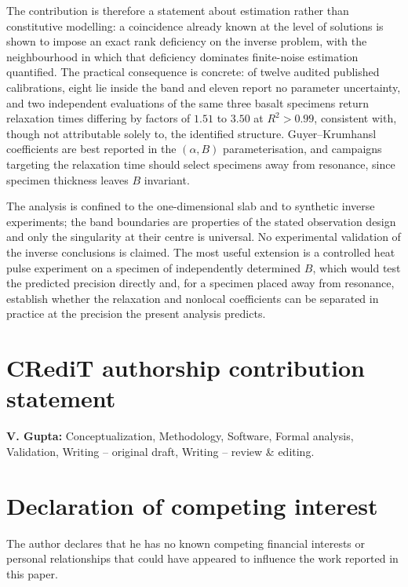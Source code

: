 \documentclass[preprint,12pt,a4paper]{elsarticle}
\theoremstyle{plain}
\theoremstyle{definition}
\theoremstyle{remark}
\newcommand{\Bnum}{B}
\begin{document}
The contribution is therefore a statement about estimation rather than
constitutive modelling: a coincidence already known at the level of
solutions is shown to impose an exact rank deficiency on the inverse
problem, with the neighbourhood in which that deficiency dominates
finite-noise estimation quantified. The practical consequence is concrete:
of twelve audited published calibrations, eight lie inside the band and
eleven report no parameter uncertainty, and two independent evaluations of
the same three basalt specimens return relaxation times differing by
factors of $1.51$ to $3.50$ at $R^{2}>0.99$, consistent with, though not
attributable solely to, the identified structure. Guyer--Krumhansl
coefficients are best reported in the $(\alpha,\Bnum)$ parameterisation, and
campaigns targeting the relaxation time should select specimens away from
resonance, since specimen thickness leaves $\Bnum$ invariant.

The analysis is confined to the one-dimensional slab and to synthetic inverse
experiments; the band boundaries are properties of the stated observation design
and only the singularity at their centre is universal. No experimental
validation of the inverse conclusions is claimed. The most useful extension is a
controlled heat pulse experiment on a specimen of independently determined
$\Bnum$, which would test the predicted precision directly and, for a specimen
placed away from resonance, establish whether the relaxation and nonlocal
coefficients can be separated in practice at the precision the present analysis
predicts.

\section*{CRediT authorship contribution statement}

\textbf{V. Gupta:} Conceptualization, Methodology, Software, Formal
analysis, Validation, Writing -- original draft, Writing -- review \&
editing.

\section*{Declaration of competing interest}

The author declares that he has no known competing financial interests or
personal relationships that could have appeared to influence the work
reported in this paper.
\end{document}
